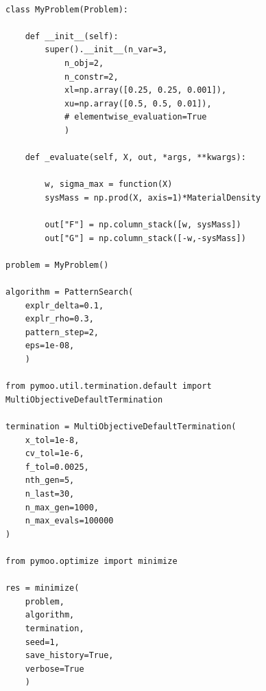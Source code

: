\documentclass[a4paper,12pt]{article}
\begin{document}
\begin{verbatim}

class MyProblem(Problem):

	def __init__(self):
		super().__init__(n_var=3, 
			n_obj=2,
			n_constr=2,
			xl=np.array([0.25, 0.25, 0.001]),
			xu=np.array([0.5, 0.5, 0.01]),
			# elementwise_evaluation=True
			)

	def _evaluate(self, X, out, *args, **kwargs):

		w, sigma_max = function(X) 
		sysMass = np.prod(X, axis=1)*MaterialDensity

		out["F"] = np.column_stack([w, sysMass])
		out["G"] = np.column_stack([-w,-sysMass])

problem = MyProblem()

algorithm = PatternSearch(
	explr_delta=0.1,
	explr_rho=0.3,
	pattern_step=2,	
	eps=1e-08, 
	)

from pymoo.util.termination.default import MultiObjectiveDefaultTermination

termination = MultiObjectiveDefaultTermination(
    x_tol=1e-8,
    cv_tol=1e-6,
    f_tol=0.0025,
    nth_gen=5,
    n_last=30,
    n_max_gen=1000,
    n_max_evals=100000
)

from pymoo.optimize import minimize

res = minimize(
	problem, 
	algorithm, 
	termination, 
	seed=1, 
	save_history=True, 
	verbose=True
	)

\end{verbatim}




\end{document}
